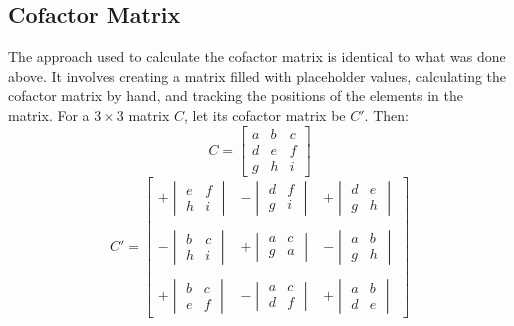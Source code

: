 \documentclass[12pt]{article}
\begin{document}
\subsection{Cofactor Matrix}
The approach used to calculate the cofactor matrix is identical to what was done above. It involves creating a matrix filled with placeholder values, calculating the cofactor matrix by hand, and tracking the positions of the elements in the matrix. For a $3\times3$ matrix $C$, let its cofactor matrix be $C'$. Then:
\[
C =
\begin{bmatrix}
    a & b & c \\
    d & e & f \\
    g & h & i
\end{bmatrix}
\]
\[
C' =
\begin{bmatrix}
    +\begin{vmatrix}
    e & f\\
    h & i
    \end{vmatrix} & 
    -\begin{vmatrix}
    d & f\\
    g & i
    \end{vmatrix} & 
    +\begin{vmatrix}
    d & e\\
    g & h
    \end{vmatrix}\\\\
    
    -\begin{vmatrix}
    b & c\\
    h & i
    \end{vmatrix} & 
    +\begin{vmatrix}
    a & c\\
    g & a
    \end{vmatrix} & 
    -\begin{vmatrix}
    a & b\\
    g & h
    \end{vmatrix}\\\\
    
    +\begin{vmatrix}
    b & c\\
    e & f
    \end{vmatrix} & 
    -\begin{vmatrix}
    a & c\\
    d & f
    \end{vmatrix} & 
    +\begin{vmatrix}
    a & b\\
    d & e
    \end{vmatrix}
\end{bmatrix}
\]
\end{document}
